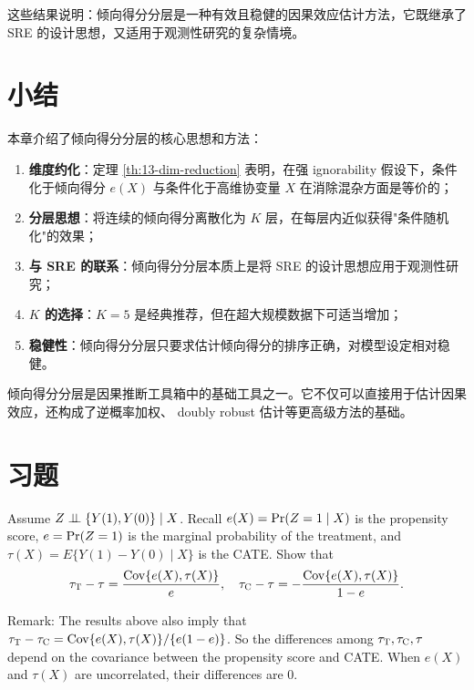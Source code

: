 这些结果说明：倾向得分分层是一种有效且稳健的因果效应估计方法，它既继承了 SRE 的设计思想，又适用于观测性研究的复杂情境。

\section{小结}\label{sec:13-summary}

本章介绍了倾向得分分层的核心思想和方法：

\begin{enumerate}
  \item \textbf{维度约化}：定理 \ref{th:13-dim-reduction} 表明，在强 ignorability 假设下，条件化于倾向得分 $e(X)$ 与条件化于高维协变量 $X$ 在消除混杂方面是等价的；
  \item \textbf{分层思想}：将连续的倾向得分离散化为 $K$ 层，在每层内近似获得"条件随机化"的效果；
  \item \textbf{与 SRE 的联系}：倾向得分分层本质上是将 SRE 的设计思想应用于观测性研究；
  \item \textbf{$K$ 的选择}：$K=5$ 是经典推荐，但在超大规模数据下可适当增加；
  \item \textbf{稳健性}：倾向得分分层只要求估计倾向得分的排序正确，对模型设定相对稳健。
\end{enumerate}

倾向得分分层是因果推断工具箱中的基础工具之一。它不仅可以直接用于估计因果效应，还构成了逆概率加权、 doubly robust 估计等更高级方法的基础。

\section{习题}\label{sec:13-homework}

\begin{HomeworkProblem}\label{exr:13-1}

Assume $Z\mathrel{\perp\!\!\!\perp} \{Y(1), Y(0)\} \mid X$.  Recall $e(X) = \operatorname{Pr}(Z=1\mid X)$ is the propensity score,  $e = \operatorname{Pr}(Z=1)$ is the marginal probability of the treatment, and $\tau(X) = E\{  Y(1)-Y(0) \mid X \}$ is the CATE.
Show that
\[
\tau_\textsc{T} - \tau = \frac{  \operatorname{Cov}\{ e(X) ,  \tau(X)  \} }{e},\quad
\tau_\textsc{C} - \tau = - \frac{  \operatorname{Cov}\{ e(X) ,  \tau(X)  \} }{1-e}.
\]


Remark: The results above also imply that $ \tau_\textsc{T} -  \tau_\textsc{C} =  \operatorname{Cov}\{ e(X) ,  \tau(X)  \} / \{  e(1-e) \}$.  So the differences among $ \tau_\textsc{T} ,   \tau_\textsc{C} , \tau$ depend on the covariance between the propensity score and CATE.
When $e(X) $ and $  \tau(X) $ are uncorrelated, their differences are 0.


\end{HomeworkProblem}

